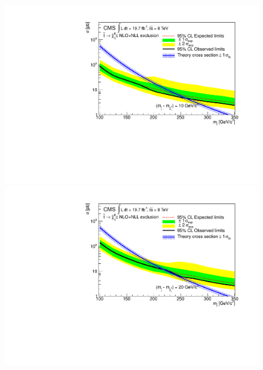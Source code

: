 \begin{figure}[!Hhtb]
  \begin{center}
  \includegraphics[scale=0.39]{Figures/sus13009/limits/Limit10.pdf}
  \includegraphics[scale=0.39]{Figures/sus13009/limits/Limit20.pdf}

\end{center}
\end{figure}
